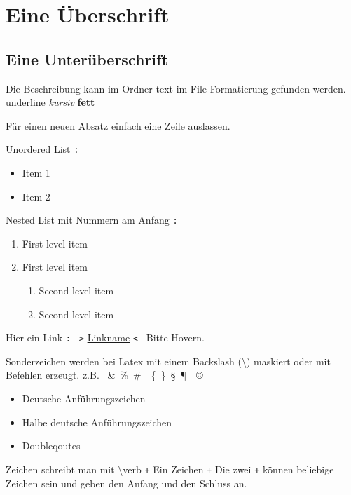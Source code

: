 \section{Eine Überschrift}
\label{sec:Eine_Überschrift}

\subsection{Eine Unterüberschrift}

Die Beschreibung kann im Ordner text im File Formatierung gefunden werden.
\underline{underline} \textit{kursiv} \textbf{fett}

Für einen neuen Absatz einfach eine Zeile auslassen.

Unordered List \verb-:-
\begin{itemize}
    \item  Item 1
    \item  Item 2
\end{itemize}

Nested List mit Nummern am Anfang \verb-:-
\begin{enumerate}
    \item First level item
    \item First level item
    \begin{enumerate}
        \item Second level item
        \item Second level item
    \end{enumerate}
\end{enumerate}

Hier ein Link \verb-:- \verb+->+
\href{http://detexify.kirelabs.org/classify.html}{Linkname}
\verb+<-+ Bitte Hovern.

Sonderzeichen werden bei Latex mit einem Backslash (\textbackslash) maskiert oder mit Befehlen erzeugt. z.B. \textdollar\ \&\ \%\ \#\ \textbar\ \{\ \}\ \S\ \P\ \textbullet\ \copyright\

\begin{itemize}
    \item \glqq Deutsche Anführungszeichen\grqq
    \item \glq Halbe deutsche Anführungszeichen\grq
    \item \dq Doubleqoutes\dq
\end{itemize}

Zeichen schreibt man mit \textbackslash verb \verb-+- Ein Zeichen \verb-+- Die zwei \verb-+- können
beliebige Zeichen sein und geben den Anfang und den Schluss an.

